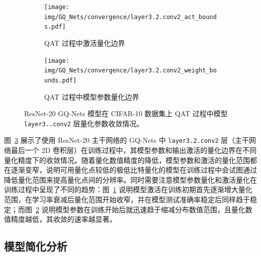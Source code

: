 \documentclass[
  fontset = mac,
]{shtthesis}
\begin{document}
\begin{figure}[htb]
  \centering
  \begin{subfigure}[t]{0.45\columnwidth}
    \centering
    \texttt{[image: img/GQ\_Nets/convergence/layer3.2.conv2\_act\_bounds.pdf]}
    \caption{QAT 过程中激活量化边界}
    \label{img::gq_nets::act_bounds}
  \end{subfigure}
  \quad
  \begin{subfigure}[t]{0.45\columnwidth}
    \centering
    \texttt{[image: img/GQ\_Nets/convergence/layer3.2.conv2\_weight\_bounds.pdf]}
    \caption{QAT 过程中模型参数量化边界}
    \label{img::gq_nets::weight_bounds}
  \end{subfigure}
  \caption{ResNet-20 GQ-Nets 模型在 CIFAR-10 数据集上 QAT 过程中模型 \texttt{layer3..\-conv2} 层量化参数收敛情况。}
  \label{img::gq_nets::res20_quant_bounds}
\end{figure}

图~\ref{img::gq_nets::res20_quant_bounds} 展示了使用 ResNet-20 主干网络的 GQ-Nets 中 \verb|layer3.2.conv2| 层（主干网络最后一个 2D 卷积层）在训练过程中，其模型参数和输出激活的量化边界在不同量化精度下的收敛情况。随着量化数值精度的降低，模型参数和激活的量化范围都在逐渐变窄，说明可用量化点较低的极低比特量化的模型在训练过程中会试图通过降低量化范围来提高量化点间的分辨率。同时需要注意模型参数量化和激活量化在训练过程中呈现了不同的趋势：图~\ref{img::gq_nets::act_bounds} 说明模型激活在训练初期首先逐渐增大量化范围，在学习率衰减后量化范围开始收窄，并在模型测试准确率稳定后同样趋于稳定；而图~\ref{img::gq_nets::weight_bounds} 说明模型参数在训练开始后就迅速趋于缩减分布数值范围，且量化数值精度越低，其收敛的速率越显著。
\subsection{模型简化分析} \label{sec::gq_nets::ablation_study}
\end{document}
